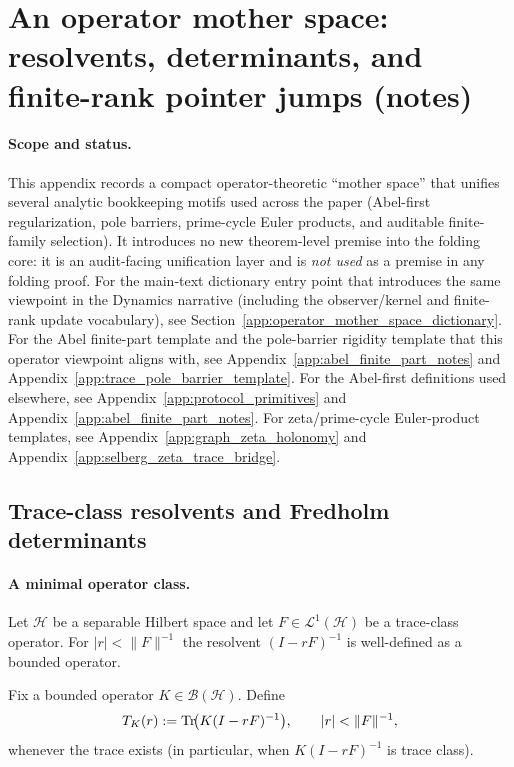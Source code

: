 \section{An operator mother space: resolvents, determinants, and finite-rank pointer jumps (notes)}
\label{app:operator_mother_space}

\paragraph{Scope and status.}
\AuditTag This appendix records a compact operator-theoretic ``mother space'' that unifies several analytic bookkeeping motifs used across the paper (Abel-first regularization, pole barriers, prime-cycle Euler products, and auditable finite-family selection).
It introduces no new theorem-level premise into the folding core: it is an audit-facing unification layer and is \emph{not used} as a premise in any folding proof.
For the main-text dictionary entry point that introduces the same viewpoint in the Dynamics narrative (including the observer/kernel and finite-rank update vocabulary), see Section~\ref{app:operator_mother_space_dictionary}.
For the Abel finite-part template and the pole-barrier rigidity template that this operator viewpoint aligns with, see Appendix~\ref{app:abel_finite_part_notes} and Appendix~\ref{app:trace_pole_barrier_template}.
For the Abel-first definitions used elsewhere, see Appendix~\ref{app:protocol_primitives} and Appendix~\ref{app:abel_finite_part_notes}.
For zeta/prime-cycle Euler-product templates, see Appendix~\ref{app:graph_zeta_holonomy} and Appendix~\ref{app:selberg_zeta_trace_bridge}.

\subsection{Trace-class resolvents and Fredholm determinants}
\label{subsec:operator_mother_space_traceclass}

\paragraph{A minimal operator class.}
\MathTag Let $\mathcal{H}$ be a separable Hilbert space and let $F\in\mathcal{L}^1(\mathcal{H})$ be a trace-class operator.
For $|r|<\|F\|^{-1}$ the resolvent $(I-rF)^{-1}$ is well-defined as a bounded operator.

\begin{definition}\label{def:kernel_weighted_resolvent_trace}
\MathTag Fix a bounded operator $K\in\mathcal{B}(\mathcal{H})$.
Define
\[
T_K(r):=\mathrm{Tr}\!\bigl(K(I-rF)^{-1}\bigr),
\qquad |r|<\|F\|^{-1},
\]
whenever the trace exists (in particular, when $K(I-rF)^{-1}$ is trace class).
\end{definition}


